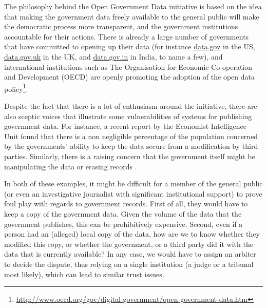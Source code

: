 The philosophy behind the Open Government Data initiative is based on the idea that making the government data freely available to the general public will make the democratic process more transparent, and the government institutions accountable for their actions. There is already a large number of governments that have committed to opening up their data (for instance \url{data.gov} in the US, \url{data.gov.uk} in the UK, and \url{data.gov.in} in India, to name a few), and international institutions such as The Organisation for Economic Co-operation and Development (OECD) are openly promoting the adoption of the open data policy\footnote{\url{http://www.oecd.org/gov/digital-government/open-government-data.htm}}.

Despite the fact that there is a lot of enthusiasm around the initiative, there are also sceptic voices that illustrate some vulnerabilities of  systems for publishing government data. For instance, a recent report by the Economist Intelligence Unit \cite{economist} found that there is a non negligible percentage of the population concerned by the governments' ability to keep the data secure from a modification by third parties. Similarly, there is a raising concern that the government itself might be manipulating the data or erasing records \cite{poynter}. 

In both of these examples, it might be difficult for a member of the general public (or even an investigative journalist with significant institutional support) to prove foul play with regards to government records. First of all, they would have to keep a copy of the government data. Given the volume of the data that the government publishes, this can be prohibitively expensive. Second, even if a person had an (alleged) local copy of the data, how are we to know whether they modified this  copy, or whether the government, or a third party did it with the data that is currently available? In any case, we would have to assign an arbiter to decide the dispute, thus relying on a single institution (a judge or a tribunal most likely), which can lead to similar trust issues.




